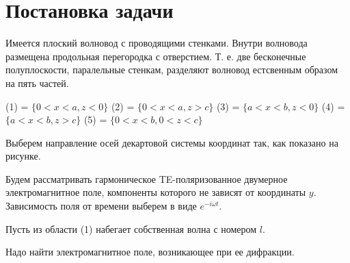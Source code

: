 \section{Постановка задачи}

Имеется плоский волновод с проводящими стенками. Внутри волновода размещена продольная перегородка с отверстием. Т. е. две бесконечные полуплоскости, паралельные стенкам, разделяют волновод естсвенным образом на пять частей.

(1) = $\{0<x<a, z<0\}$
(2) = $\{0<x<a, z>c\}$
(3) = $\{a<x<b, z<0\}$
(4) = $\{a<x<b, z>c\}$
(5) = $\{0<x<b, 0<z<c\}$

Выберем направление осей декартовой системы координат так, как показано на рисунке.


Будем рассматривать гармоническое TE-поляризованное двумерное электромагнитное поле, компоненты которого не зависят от координаты $y$. Зависимость поля от времени выберем в виде $e^{-i\omega t}$.

Пусть из области (1) набегает собственная волна с номером $l$.

Надо найти электромагнитное поле, возникающее при ее дифракции.